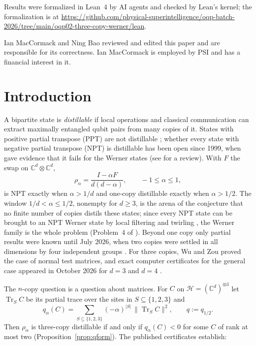 \documentclass[aps,pra,twocolumn,superscriptaddress,nofootinbib,longbibliography]{revtex4-2}
\newcommand{\C}{\mathbb C}
\newcommand{\Hh}{\mathcal H}
\DeclareMathOperator{\Tr}{Tr}
\theoremstyle{plain}
\theoremstyle{definition}
\theoremstyle{remark}
\begin{document}
Results were formalized in Lean~4 by AI agents and checked by Lean's kernel; the formalization is at \url{https://github.com/physical-superintelligence/oqp-batch-2026/tree/main/oqp02-three-copy-werner/lean}.

Ian MacCormack and Ning Bao reviewed and edited this paper and are responsible for its correctness. Ian MacCormack is employed by PSI and has a financial interest in it.

\section{Introduction}\label{sec:intro}

A bipartite state is \emph{distillable} if local operations and classical communication can extract maximally entangled qubit pairs from many copies of it. States with positive partial transpose (PPT) are not distillable \cite{HHH98}; whether every state with negative partial transpose (NPT) is distillable has been open since 1999, when \cite{DSSTT,DCLB} gave evidence that it fails for the Werner states \cite{Werner} (see \cite{HHHreview} for a review). With $F$ the swap on $\C^d\otimes\C^d$,
\begin{equation}\label{eq:werner}
\rho_\alpha=\frac{I-\alpha F}{d(d-\alpha)},\qquad -1\le\alpha\le1 ,
\end{equation}
is NPT exactly when $\alpha>1/d$ and one-copy distillable exactly when $\alpha>1/2$. The window $1/d<\alpha\le1/2$, nonempty for $d\ge3$, is the arena of the conjecture that no finite number of copies distils these states; since every NPT state can be brought to an NPT Werner state by local filtering and twirling \cite{HH99}, the Werner family is the whole problem (Problem~4 of \cite{HRZ}). Beyond one copy only partial results \cite{DSSTT,DCLB,VD,PPHH,QGWG,CostaRico} were known until July 2026, when two copies were settled in all dimensions by four independent groups \cite{FuGaoPark,SongChen,FHPV,BGH}. For three copies, Wu and Zou \cite{WuZou} proved the case of normal test matrices, and exact computer certificates for the general case appeared in October 2026 for $d=3$ \cite{Zenodo} and $d=4$ \cite{Liu}.

The $n$-copy question is a question about matrices. For $C$ on $\Hh=(\C^d)^{\otimes3}$ let $\Tr_SC$ be its partial trace over the sites in $S\subseteq\{1,2,3\}$ and
\begin{equation}\label{eq:q}
q_\alpha(C)=\sum_{S\subseteq\{1,2,3\}}(-\alpha)^{|S|}\,\|\Tr_SC\|^2,\qquad q:=q_{1/2}.
\end{equation}
Then $\rho_\alpha$ is three-copy distillable if and only if $q_\alpha(C)<0$ for some $C$ of rank at most two (Proposition~\ref{prop:qform}). The published certificates establish:
\end{document}
